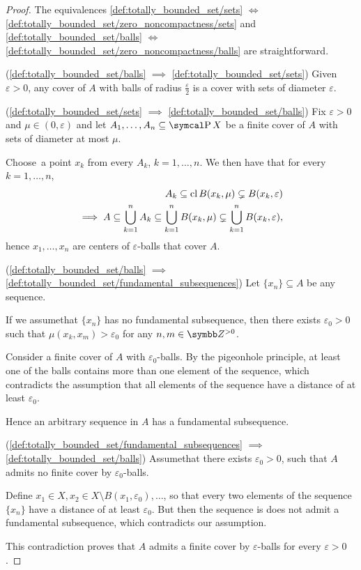 \begin{proof}
  The equivalences \ref{def:totally_bounded_set/sets} $\iff$ \ref{def:totally_bounded_set/zero_noncompactness/sets} and \ref{def:totally_bounded_set/balls} $\iff$ \ref{def:totally_bounded_set/zero_noncompactness/balls} are straightforward.

  (\ref{def:totally_bounded_set/balls} $\implies$ \ref{def:totally_bounded_set/sets}) Given $\varepsilon > 0$, any cover of $A$ with balls of radius $\frac \varepsilon 2$ is a cover with sets of diameter $\varepsilon$.

  (\ref{def:totally_bounded_set/sets} $\implies$ \ref{def:totally_bounded_set/balls}) Fix $\varepsilon > 0$ and $\mu \in (0, \varepsilon)$ and let $A_1, \ldots, A_n \subseteq \Power X$ be a finite cover of $A$ with sets of diameter at most $\mu$.

  Choose\AOC~a point $x_k$ from every $A_k$, $k = 1, \ldots, n$. We then have that for every $k = 1, \ldots, n$,
  \begin{align*}
    A_k \subseteq \operatorname{cl} B(x_k, \mu) \subsetneq B(x_k, \varepsilon)
    \\
    \implies A \subseteq \bigcup_{k=1}^n A_k \subseteq \bigcup_{k=1}^n B(x_k, \mu) \subsetneq \bigcup_{k=1}^n B(x_k, \varepsilon),
  \end{align*}
  hence $x_1, \ldots, x_n$ are centers of $\varepsilon$-balls that cover $A$.

  (\ref{def:totally_bounded_set/balls} $\implies$ \ref{def:totally_bounded_set/fundamental_subsequences}) Let $\{ x_n \} \subseteq A$ be any sequence.

  If we assume\LEM that $\{ x_n \}$ has no fundamental subsequence, then there exists $\varepsilon_0 > 0$ such that $\mu(x_k, x_m) > \varepsilon_0$ for any $n, m \in \BB{Z}^{>0}$.

  Consider a finite cover of $A$ with $\varepsilon_0$-balls. By the pigeonhole principle, at least one of the balls contains more than one element of the sequence, which contradicts the assumption that all elements of the sequence have a distance of at least $\varepsilon_0$.

  Hence an arbitrary sequence in $A$ has a fundamental subsequence.

  (\ref{def:totally_bounded_set/fundamental_subsequences} $\implies$ \ref{def:totally_bounded_set/balls}) Assume\LEM that there exists $\varepsilon_0 > 0$, such that $A$ admits no finite cover by $\varepsilon_0$-balls.

  Define $x_1 \in X, x_2 \in X \setminus B(x_1, \varepsilon_0), \ldots$, so that every two elements of the sequence $\{ x_n \}$ have a distance of at least $\varepsilon_0$. But then the sequence is does not admit a fundamental subsequence, which contradicts our assumption.

  This contradiction proves that $A$ admits a finite cover by $\varepsilon$-balls for every $\varepsilon > 0$.
\end{proof}

